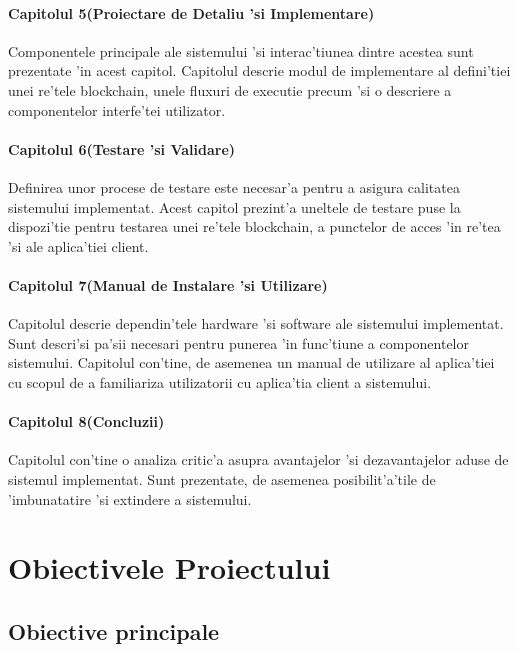 \documentclass[12pt,a4paper,twoside]{report}
\begin{document}
    \subsubsection{Capitolul 5(Proiectare de Detaliu 'si Implementare)}
    Componentele principale ale sistemului 'si interac'tiunea dintre acestea sunt prezentate 'in acest capitol. Capitolul descrie modul de implementare al defini'tiei unei re'tele blockchain, unele fluxuri de executie precum 'si o descriere a componentelor interfe'tei utilizator.
    
    \subsubsection{Capitolul 6(Testare 'si Validare)}
    Definirea unor procese de testare este necesar'a pentru a asigura calitatea sistemului implementat. Acest capitol prezint'a uneltele de testare puse la dispozi'tie pentru testarea unei re'tele blockchain, a punctelor de acces 'in re'tea 'si ale aplica'tiei client.
    
    \subsubsection{Capitolul 7(Manual de Instalare 'si Utilizare)}
    Capitolul descrie dependin'tele hardware 'si software ale sistemului implementat. Sunt descri'si pa'sii necesari pentru punerea 'in func'tiune a componentelor sistemului. Capitolul con'tine, de asemenea un manual de utilizare al aplica'tiei cu scopul de a familiariza utilizatorii cu aplica'tia client a sistemului.
    
    \subsubsection{Capitolul 8(Concluzii)}
    Capitolul con'tine o analiza critic'a asupra avantajelor 'si dezavantajelor aduse de sistemul implementat. Sunt prezentate, de asemenea posibilit'a'tile de 'imbunatatire 'si extindere a sistemului.



\newpage
\thispagestyle{empty}
\mbox{}

\chapter{Obiectivele Proiectului}

\section{Obiective principale}
\end{document}

